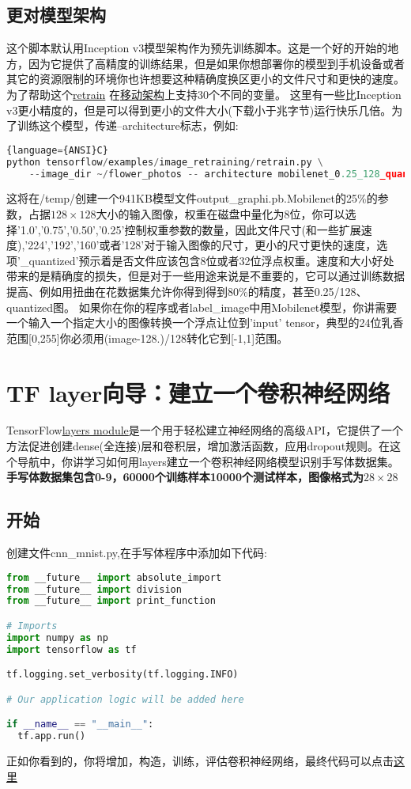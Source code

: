 \subsection{更对模型架构}
这个脚本默认用Inception v3模型架构作为预先训练脚本。这是一个好的开始的地方，因为它提供了高精度的训练结果，但是如果你想部署你的模型到手机设备或者其它的资源限制的环境你也许想要这种精确度换区更小的文件尺寸和更快的速度。
为了帮助这个\href{https://github.com/tensorflow/tensorflow/blob/master/tensorflow/examples/image_retraining/retrain.py}{retrain}
在\href{https://research.googleblog.com/2017/06/mobilenets-open-source-models-for.html}{移动架构}上支持30个不同的变量。
这里有一些比Inception v3更小精度的，但是可以得到更小的文件大小(下载小于兆字节)运行快乐几倍。为了训练这个模型，传递--architecture标志，例如:
\begin{lstlisting}[language=Python]{language={ANSI}C}
python tensorflow/examples/image_retraining/retrain.py \
    --image_dir ~/flower_photos -- architecture mobilenet_0.25_128_quantized
\end{lstlisting}
这将在/temp/创建一个941KB模型文件output\_graphi.pb.Mobilenet的25\%的参数，占据$128\times128$大小的输入图像，权重在磁盘中量化为8位，你可以选择'1.0','0.75','0.50','0.25'控制权重参数的数量，因此文件尺寸(和一些扩展速度),'224','192','160'或者'128'对于输入图像的尺寸，更小的尺寸更快的速度，选项'\_quantized'预示着是否文件应该包含8位或者32位浮点权重。速度和大小好处带来的是精确度的损失，但是对于一些用途来说是不重要的，它可以通过训练数据提高、例如用扭曲在花数据集允许你得到得到80\%的精度，甚至0.25/128、quantized图。
如果你在你的程序或者label\_image中用Mobilenet模型，你讲需要一个输入一个指定大小的图像转换一个浮点让位到'input' tensor，典型的24位乳香范围[0,255]你必须用(image-128.)/128转化它到[-1,1]范围。

\section{TF layer向导：建立一个卷积神经网络}
TensorFlow\href{https://www.tensorflow.org/api_docs/python/tf/layers}{layers module}是一个用于轻松建立神经网络的高级API，它提供了一个方法促进创建dense(全连接)层和卷积层，增加激活函数，应用dropout规则。在这个导航中，你讲学习如何用layers建立一个卷积神经网络模型识别手写体数据集。
\textbf{手写体数据集包含0-9，60000个训练样本10000个测试样本，图像格式为}$28\times28$
\subsection{开始}
创建文件cnn\_mnist.py,在手写体程序中添加如下代码:
\begin{lstlisting}[language=Python]
from __future__ import absolute_import
from __future__ import division
from __future__ import print_function

# Imports
import numpy as np
import tensorflow as tf

tf.logging.set_verbosity(tf.logging.INFO)

# Our application logic will be added here

if __name__ == "__main__":
  tf.app.run()
\end{lstlisting}
正如你看到的，你将增加，构造，训练，评估卷积神经网络，最终代码可以点击\href{https://www.github.com/tensorflow/tensorflow/blob/r1.3/tensorflow/examples/tutorials/layers/cnn_mnist.py}{这里}

